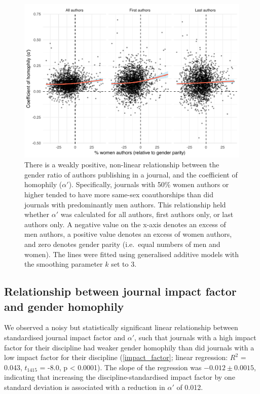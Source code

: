 \documentclass[12pt,]{article}
\begin{document}
\begin{figure}
\centering
\includegraphics{../figures/Fig4.pdf}
\caption{There is a weakly positive, non-linear relationship between the
gender ratio of authors publishing in a journal, and the coefficient of
homophily (\(\alpha'\)). Specifically, journals with 50\% women authors
or higher tended to have more same-sex coauthorships than did journals
with predominantly men authors. This relationship held whether
\(\alpha'\) was calculated for all authors, first authors only, or last
authors only. A negative value on the x-axis denotes an excess of men
authors, a positive value denotes an excess of women authors, and zero
denotes gender parity (i.e.~equal numbers of men and women). The lines
were fitted using generalised additive models with the smoothing
parameter \(k\) set to 3. \label{alpha_gender_ratio}}
\end{figure}

\hypertarget{relationship-between-journal-impact-factor-and-gender-homophily}{%
\subsection{Relationship between journal impact factor and gender
homophily}\label{relationship-between-journal-impact-factor-and-gender-homophily}}

We observed a noisy but statistically significant linear relationship
between standardised journal impact factor and \(\alpha'\), such that
journals with a high impact factor for their discipline had weaker
gender homophily than did journals with a low impact factor for their
discipline (\autoref{impact_factor}; linear regression: \(R^2\) = 0.043,
\(t_{1415}\) = -8.0, p \textless{} 0.0001). The slope of the regression
was \(-0.012{\pm}0.0015\), indicating that increasing the
discipline-standardised impact factor by one standard deviation is
associated with a reduction in \(\alpha'\) of 0.012.
\end{document}
